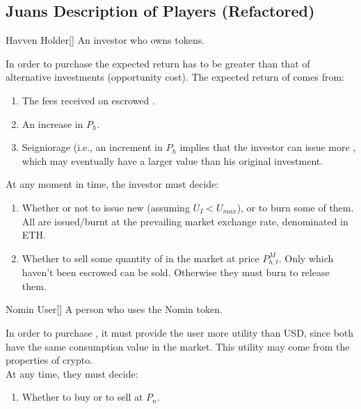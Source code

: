 \newpage

\subsection{Juans Description of Players (Refactored)}
\begin{namedthm}{Havven Holder}[]
An investor who owns \HAV{} tokens.
\end{namedthm}

\noindent In order to purchase \HAV{} the expected return has to be greater than that of alternative investments (opportunity cost). The expected return of \HAV{} comes from:
\begin{enumerate}
\item{The fees received on escrowed \HAV{}.}
\item{An increase in $P_h$.}
\item{Seigniorage (i.e., an increment in $P_h$ implies that the investor can issue more \NOM{}, which may eventually have a larger value than his original investment.}
\end{enumerate}

\noindent At any moment in time, the investor must decide:
\begin{enumerate}
\item{Whether or not to issue new \NOM{} (assuming $U_I < U_{max}$), or to burn some of them. All \NOM{} are issued/burnt at the prevailing market exchange rate, denominated in ETH.}
\item{Whether to sell some quantity of \HAV{} in the market at price $P^M_{h,t}$. Only \HAV{} which haven't been escrowed can be sold. Otherwise they must burn \NOM{} to release them. }
\end{enumerate}

\begin{namedthm}{Nomin User}[]
A person who uses the Nomin token.
\end{namedthm}
 
\noindent In order to purchase \NOM{}, it must provide the user more utility than USD, since both have the same consumption value in the market. This utility may come from the properties of crypto. \\

\noindent At any time, they must decide: 
\begin{enumerate}
\item{Whether to buy or to sell \NOM{} at $P_n$.}
\end{enumerate}

\newpage